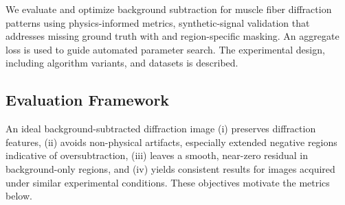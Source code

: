 \documentclass[iucr]{iucrjournals}
\begin{document}
We evaluate and optimize background subtraction for muscle fiber diffraction patterns using physics-informed metrics, synthetic-signal validation that addresses missing ground truth with and region-specific masking. An aggregate loss is used to guide automated parameter search. The experimental design, including algorithm variants, and datasets is described.



\subsection{Evaluation Framework}




An ideal background-subtracted diffraction image (i) preserves diffraction features, (ii) avoids non-physical artifacts, especially extended negative regions indicative of oversubtraction, (iii) leaves a smooth, near-zero residual in background-only regions, and (iv) yields consistent results for images acquired under similar experimental conditions. These objectives motivate the metrics below.
\end{document}
